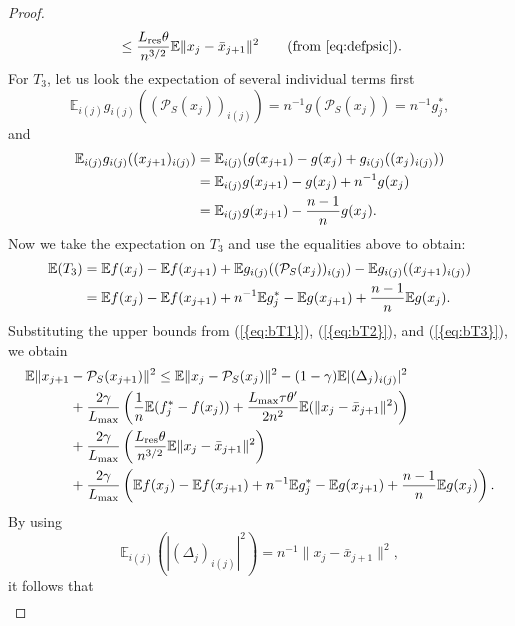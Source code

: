 \documentclass{siamltex}
\begin{document}
\begin{proof}
\begin{alignat}{2}
&\quad \leq \frac{{L_{\mbox{\rm\scriptsize res}}}\theta}{n^{3/2}} {\mathbb{E}}\|x_j-\bar{x}_{j+1}\|^2 \quad 
&& (\text{from \eqref{eq:defpsic}}).
\end{alignat}
For $T_3$, let us look the expectation of several individual terms first
\[{\mathbb{E}}_{i(j)} g_{i(j)}(({\mathcal{P}_{S}}(x_j))_{i(j)}) = n^{-1}g({\mathcal{P}_{S}}(x_j)) = n^{-1}g^*_j,\] and
\begin{align*}
{\mathbb{E}}_{i(j)} g_{i(j)}((x_{j+1})_{i(j)}) &=  {\mathbb{E}}_{i(j)} (g(x_{j+1})-g(x_j) + g_{i(j)}((x_j)_{i(j)})) 
\\ &=  
{\mathbb{E}}_{i(j)} g(x_{j+1}) - g(x_j) + n^{-1} g(x_j) 
\\ &= 
{\mathbb{E}}_{i(j)} g(x_{j+1}) - {n-1\over n}g(x_j).
\end{align*}
Now we take the expectation on $T_3$ and use the equalities above to obtain:
\begin{align}
\nonumber 
{\mathbb{E}}(T_3) &= {\mathbb{E}} f(x_j) - {\mathbb{E}} f(x_{j+1}) + {\mathbb{E}} g_{i(j)}(({\mathcal{P}_{S}}(x_j))_{i(j)}) - {\mathbb{E}} g_{i(j)}((x_{j+1})_{i(j)}) 
\\
\label{eq:bT3}
& = {\mathbb{E}} f(x_j) - {\mathbb{E}} f(x_{j+1}) + n^{-1} {\mathbb{E}} g^*_j - {\mathbb{E}} g(x_{j+1}) + {n-1\over n} {\mathbb{E}} g(x_j). 
\end{align}
Substituting the upper bounds from {(\ref{{eq:bT1}})}, {(\ref{{eq:bT2}})}, and {(\ref{{eq:bT3}})}, we obtain
\begin{align}
\nonumber
{\mathbb{E}}\|x_{j+1} & - {\mathcal{P}_{S}}(x_{j+1})\|^2 \leq {\mathbb{E}} \|x_j - {\mathcal{P}_{S}}(x_j)\|^2 - (1-\gamma) {\mathbb{E}} |(\Delta_j)_{i(j)}|^2 
\\ \nonumber & +
{2\gamma \over {L_{\mbox{\rm\scriptsize max}}}}\left({1\over n}{\mathbb{E}} (f^*_j - f(x_j)) + {{L_{\mbox{\rm\scriptsize max}}} \tau\theta' \over 2n^2} {\mathbb{E}}(\|x_j-\bar{x}_{j+1}\|^2) \right) 
\\ \nonumber & +
{2\gamma \over {L_{\mbox{\rm\scriptsize max}}}}\left(\frac{{L_{\mbox{\rm\scriptsize res}}}\theta}{n^{3/2}} {\mathbb{E}}\|x_j-\bar{x}_{j+1}\|^2\right)
\\ \nonumber & +
{2\gamma \over {L_{\mbox{\rm\scriptsize max}}}}\left({\mathbb{E}} f(x_j) - {\mathbb{E}} f(x_{j+1}) + n^{-1} {\mathbb{E}} g^*_j - {\mathbb{E}} g(x_{j+1}) + {n-1\over n} {\mathbb{E}} g(x_j)\right).
\end{align}
By using
\[{\mathbb{E}}_{i(j)}(|(\Delta_j)_{i(j)}|^2) = n^{-1} \| x_j-\bar{x}_{j+1} \|^2,\]
it follows that
\begin{align}

\end{align}
\end{proof}
\end{document}
